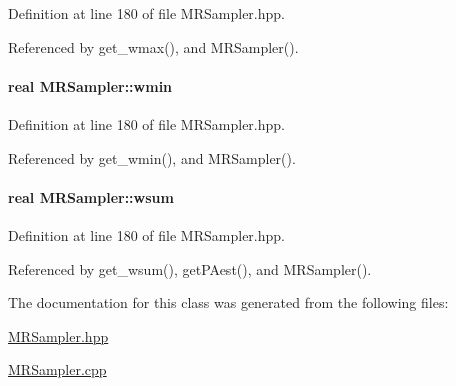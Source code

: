\-Definition at line 180 of file \-M\-R\-Sampler.\-hpp.



\-Referenced by get\-\_\-wmax(), and \-M\-R\-Sampler().

\hypertarget{classMRSampler_ad222a996bc96c32c89586628583be8bb}{
\paragraph[{wmin}]{\setlength{\rightskip}{0pt plus 5cm}real {\bf \-M\-R\-Sampler\-::wmin}}}\label{classMRSampler_ad222a996bc96c32c89586628583be8bb}


\-Definition at line 180 of file \-M\-R\-Sampler.\-hpp.



\-Referenced by get\-\_\-wmin(), and \-M\-R\-Sampler().

\hypertarget{classMRSampler_aa569a3c7e50e947daddfe9766e6aa206}{
\paragraph[{wsum}]{\setlength{\rightskip}{0pt plus 5cm}real {\bf \-M\-R\-Sampler\-::wsum}}}\label{classMRSampler_aa569a3c7e50e947daddfe9766e6aa206}


\-Definition at line 180 of file \-M\-R\-Sampler.\-hpp.



\-Referenced by get\-\_\-wsum(), get\-P\-Aest(), and \-M\-R\-Sampler().



\-The documentation for this class was generated from the following files\-:\begin{DoxyCompactItemize}
\item 
\hyperlink{MRSampler_8hpp}{\-M\-R\-Sampler.\-hpp}\item 
\hyperlink{MRSampler_8cpp}{\-M\-R\-Sampler.\-cpp}\end{DoxyCompactItemize}
